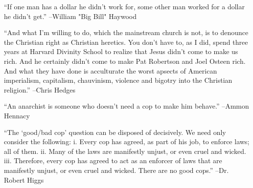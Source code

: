 \documentclass{article}%
\begin{document}
\linebreak%
\vspace{1mm}%
\begin{minipage}{\textwidth}%
\flushleft%
“If one man has a dollar he didn't work for, some other man worked for a dollar he didn't get.”%
\linebreak%
\vspace{1mm}%
–William "Big Bill" Haywood%
\linebreak%
\vspace{1mm}%
\end{minipage}%
\linebreak%
\vspace{1mm}%
\begin{minipage}{\textwidth}%
\flushleft%
“And what I'm willing to do, which the mainstream church is not, is to denounce the Christian right as Christian heretics. You don't have to, as I did, spend three years at Harvard Divinity School to realize that Jesus didn't come to make us rich. And he certainly didn't come to make Pat Robertson and Joel Osteen rich. And what they have done is acculturate the worst apsects of American imperialism, capitalism, chauvinism, violence and bigotry into the Christian religion.”%
\linebreak%
\vspace{1mm}%
–Chris Hedges%
\linebreak%
\vspace{1mm}%
\end{minipage}%
\linebreak%
\vspace{1mm}%
\begin{minipage}{\textwidth}%
\flushleft%
“An anarchist is someone who doesn't need a cop to make him behave.”%
\linebreak%
\vspace{1mm}%
–Ammon Hennacy%
\linebreak%
\vspace{1mm}%
\end{minipage}%
\linebreak%
\vspace{1mm}%
\begin{minipage}{\textwidth}%
\flushleft%
“The ‘good/bad cop’ question can be disposed of decisively. We need only consider the  following:  i. Every cop has agreed, as part of his job, to enforce laws; all of them.  ii. Many of the laws are manifestly unjust, or even cruel and wicked.  iii. Therefore, every cop has agreed to act as an enforcer of laws that are manifestly unjust, or even cruel and wicked.  There are no good cops.”%
\linebreak%
\vspace{1mm}%
–Dr. Robert Higgs%
\linebreak%
\vspace{1mm}%
\end{minipage}%
\end{document}
